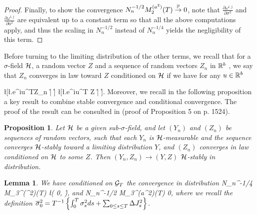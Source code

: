 \documentclass[11pt]{article}
\newtheorem{lemma*}[theorem*]{Lemma}
\newtheorem{proposition*}[theorem*]{Proposition}
\numberwithin{equation}{section}
\theoremstyle{plain}
\theoremstyle{remark}
\begin{document}
\begin{proof}
Finally, to show the convergence $N_n^{-1/2} M_{2}^{(a^2)}(T) \overset{\mathbb{P}}{\rightarrow} 0$, note that $\frac{ \partial \omega^{i,j}}{\partial \sigma^2}$ and $\frac{ \partial \omega^{i,j}}{\partial a^2}$ are equivalent up to a constant term so that all the above computations apply, and thus the scaling in $N_n^{-1/2}$ instead of $N_n^{-1/4}$ yields the negligibility of this term.

\end{proof}

Before turning to the limiting distribution of the other terms, we recall that for a $\sigma$-field ${\cal H}$, a random vector $Z$ and a sequence of random vectors $Z_n$ in $\mathbb{R}^b$ , we say that $Z_n$ converges in law toward $Z$ conditioned on ${\cal H}$ if we have for any $u \in \mathbb{R}^b$ 

\bea 
\esp \l[\l.e^{iu^TZ_n} \r| \calh \r] \overset{\proba}{\rightarrow} \esp \l[\l.e^{iu^T Z} \r| \calh \r].
\eea 
Moreover, we recall in the following proposition a key result to combine stable convergence and conditional convergence. The proof of the result can be consulted in \cite{barndorff2008designing} (proof of Proposition 5 on p. 1524).

\begin{proposition*} \label{propositionConditionalStable}
Let ${\cal H}$ be a given sub-$\sigma$-field, and let $(Y_n)$ and $(Z_n)$ be sequences of random vectors, such that each $Y_n$ is ${\cal H}$-measurable and the sequence converges ${\cal H}$-stably toward a limiting distribution $Y$, and $(Z_n)$ converges in law conditioned on ${\cal H}$ to some $Z$. Then $(Y_n,Z_n) \to (Y,Z)$ ${\cal H}$-stably in distribution. 
\end{proposition*}

\begin{lemma*} \label{lemmaM3}
We have conditioned on ${\cal G}_T$ the convergence in distribution  
\bea 
N_n^{-1/4}  M_{3}^{(\sigma^2)}(T) \to \calm \caln \l( 0,  \r), 
\eea 
and
\bea 
N_n^{-1/2} M_{3}^{(a^2)}(T) \overset{\proba}{\rightarrow} 0,
\label{eqM3a}
\eea 
where we recall the definition $\overline{\sigma}_0^2 = T^{-1}\left\{\int_0^T\sigma_s^2ds + \sum_{0\leq s\leq T}\Delta J_s^2\right\}$.
\end{lemma*}
\end{document}
